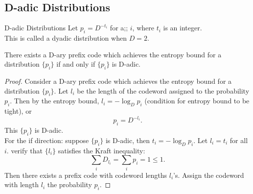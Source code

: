 \documentclass[../main.tex]{subfiles}
\begin{document}
\subsection{D-adic Distributions}
\begin{gbox}{D-adic Distributions}
    Let $p_i=D^{-t_i}$ for a;; $i$, where $t_i$ is an integer.\\
    This is called a dyadic distribution when $D=2$.
    \begin{corollary*}
        There exists a D-ary prefix code which achieves the entropy bound for a distribution $\{p_i\}$ if and only if $\{p_i\}$ is D-adic.
    \end{corollary*}
    \begin{proof}
        Consider a D-ary prefix code which achieves the entropy bound for a distribution $\{p_i\}$. Let $l_i$ be the length of the codeword assigned to the probability $p_i$. Then by the entropy bound, $l_i=-\log_D p_i$ (condition for entropy bound to be tight), or\begin{equation*}
            p_i = D^{-l_i}.
        \end{equation*}
        This $\{p_i\}$ is D-adic.\\
        For the if direction: suppose $\{p_i\}$ is D-adic, then $t_i=-\log_D p_i$. Let $l_i=t_i$ for all $i$. verify that $\{l_i\}$ satisfies the Kraft inequality:\[
        \sum_i D_{l_i} = \sum_i p_i =1\leq 1.
        \]
        Then there exists a prefix code with codeword lengths $l_i$'s. Assign the codeword with length $l_i$ the probability $p_i$. 
    \end{proof}
\end{gbox}
\end{document}
